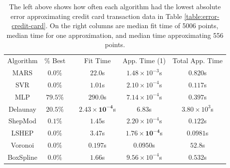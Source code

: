 \documentclass[smallextended,final]{svjour3}       %
\begin{document}
\begin{appendix}
\begin{table}
  \centering
  \begin{tabular}{|c|c| c |c|c|c|}
    \cline{1-2}\cline{4-6}
    Algorithm & \% Best &  & Fit Time & App. Time (1) & Total App. Time\\
    \cline{1-2}\cline{4-6}
    MARS & $0.0\%$ &  & $22.0$s & $1.48 \times 10^{-3}$s & $0.820$s\\
    SVR & $0.0\%$ &  & $1.01$s & $\mathit{2.10 \times 10^{-4}}$s & $\mathit{0.117}$s\\
    MLP & $\mathbf{79.5}\%$ &  & $290.0$s & $7.14 \times 10^{-4}$s & $0.397$s\\
    Delaunay & $\mathit{20.5}\%$ &  & $\mathbf{2.43 \times 10^{-4}}$s & $6.83$s & $3.80 \times 10^{3}$s\\
    ShepMod & $0.1\%$ &  & $1.45$s & $2.20 \times 10^{-4}$s & $0.122$s\\
    LSHEP & $0.0\%$ &  & $3.47$s & $\mathbf{1.76 \times 10^{-4}}$s & $\mathbf{0.0981}$s\\
    Voronoi & $0.0\%$ &  & $\mathit{0.197}$s & $0.0950$s & $52.8$s\\
    BoxSpline & $0.0\%$ &  & $1.66$s & $9.56 \times 10^{-4}$s & $0.532$s\\
    \cline{1-2}\cline{4-6}
  \end{tabular}
  \caption{The left above shows how often each algorithm had the
    lowest absolute error approximating credit card transaction data
    in Table \ref{table:error-credit-card}. On the right columns are
    median fit time of 5006 points, median time for one approximation,
    and median time approximating 556 points.}
  \label{table:best-credit-card}
\end{table}




\end{appendix}
\end{document}

